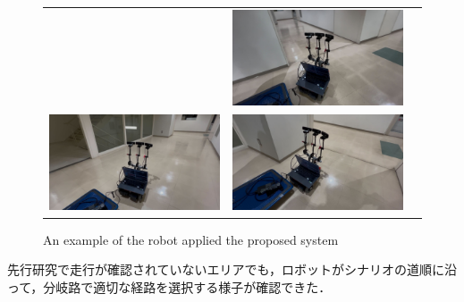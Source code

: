 \begin{figure}[htbp]
\begin{tabular}{ccc}
\begin{minipage}[t]{0.5\textwidth}
        \end{minipage} &
        \begin{minipage}[t]{0.5\textwidth}
            \centering
            \includegraphics[keepaspectratio, width=70mm]{images/png/ishiguro/exp_7.png}
        \end{minipage} \\
        \begin{minipage}[t]{0.5\textwidth}
            \centering
            \includegraphics[keepaspectratio, width=70mm]{images/png/ishiguro/exp_8.png}
        \end{minipage} &
        \begin{minipage}[t]{0.5\textwidth}
            \centering
            \includegraphics[keepaspectratio, width=70mm]{images/png/ishiguro/exp_9.png}
        \end{minipage}
    \end{tabular}
\caption{An example of the robot applied the proposed system}
\label{fig:exp_path}
\end{figure}

先行研究で走行が確認されていないエリアでも，ロボットがシナリオの道順に沿って，分岐路で適切な経路を選択する様子が確認できた．

